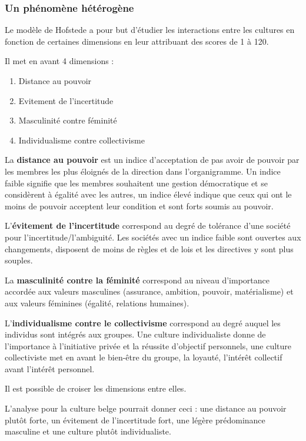 \documentclass[12pt]{article}
\begin{document}
	  \subsubsection{Un phénomène hétérogène}
	  
	  Le modèle de Hofstede a pour but d'étudier les interactions entre les cultures en fonction de certaines dimensions en leur attribuant des scores de 1 à 120.
	  
	  Il met en avant 4 dimensions :
	  
	  \begin{enumerate}
	   \item Distance au pouvoir
	   \item Evitement de l'incertitude
	   \item Masculinité contre féminité
	   \item Individualisme contre collectivisme
	  \end{enumerate}
	  
	  La \textbf{distance au pouvoir} est un indice d'acceptation de pas avoir de pouvoir par les membres les plus éloignés de la direction dans l'organigramme.
	  Un indice faible signifie que les membres souhaitent une gestion démocratique et se considèrent à égalité avec les autres, un indice élevé indique que ceux qui ont le moins de pouvoir acceptent leur condition et sont forts soumis au pouvoir.
	  
	  L'\textbf{évitement de l'incertitude} correspond au degré de tolérance d'une société pour l'incertitude/l'ambiguité. Les sociétés avec un indice faible sont ouvertes aux changements, disposent de moins de règles et de lois et les directives y sont plus souples.
	  
	  La \textbf{masculinité contre la féminité} correspond au niveau d'importance accordée aux valeurs masculines (assurance, ambition, pouvoir, matérialisme) et aux valeurs féminines (égalité, relations humaines).
	  
	  L'\textbf{individualisme contre le collectivisme} correspond au degré auquel les individus sont intégrés aux groupes. Une culture individualiste donne de l'importance à l'initiative privée et la réussite d'objectif personnels, une culture collectiviste met en avant le bien-être du groupe, la loyauté, l'intérêt collectif avant l'intérêt personnel.
	  
	  Il est possible de croiser les dimensions entre elles.
	  
	  L'analyse pour la culture belge pourrait donner ceci : une distance au pouvoir plutôt forte, un évitement de l'incertitude fort, une légère prédominance masculine et une culture plutôt individualiste.
	  
\end{document}
